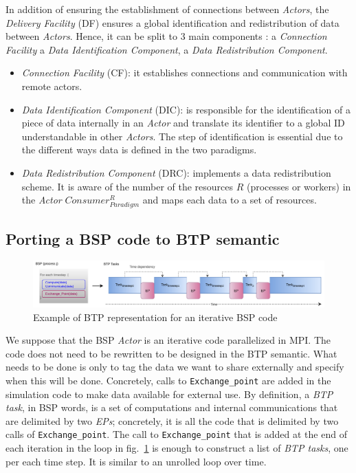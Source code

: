 In addition of ensuring the establishment of connections between \textit{Actors}, the \textit{Delivery Facility} (DF) ensures a global identification and redistribution of data between \textit{Actors}. Hence,  it can be split to 3 main components : a \textit{Connection Facility} a \textit{Data Identification Component}, a \textit{Data Redistribution Component}.
\begin{itemize}
   \item \textit{Connection Facility} (CF): it establishes connections and communication with remote actors.
   
   \item \textit{Data Identification Component} (DIC): is responsible for the identification of a piece of data internally in an \textit{Actor} and translate its identifier to a global ID understandable in other \textit{Actors}. The step of identification is essential due to the different ways data is defined in the two paradigms. 
   
   \item \textit{Data Redistribution Component} (DRC): implements a data redistribution scheme. It is aware of the number of the resources $R$ (processes or workers) in the \textit{Actor} $Consumer_{Paradigm}^{R}$ and maps each data to a set of resources.
\end{itemize}

\subsection{Porting a BSP code to BTP semantic}\label{sec:btp:porting}

\begin{figure}[tb]
\centerline{\includegraphics[width=\textwidth]{figures/unrolled.pdf}}
\caption{Example of BTP representation for an iterative BSP code}
\label{figunroll}
\end{figure}

We suppose that the BSP \textit{Actor} is an iterative code parallelized in MPI. The code does not need to be rewritten to be designed in the BTP semantic. What needs to be done is only to tag the data we want to share externally and specify when this will be done. Concretely, calls to \texttt{Exchange\_point} are added in the simulation code to make data available for external use. By definition, a \textit{BTP task}, in BSP words, is a set of computations and internal communications that are delimited by two \textit{EPs}; concretely, it is all the code that is delimited by two calls of \texttt{Exchange\_point}. The call to \texttt{Exchange\_point} that is added at the end of each iteration in the loop in fig.~\ref{figunroll} is enough to construct a list of \textit{BTP tasks}, one per each time step. It is similar to an unrolled loop over time.


